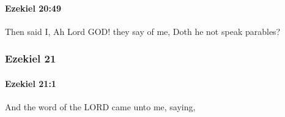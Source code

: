 		\paragraph{Ezekiel 20:49} %
			\label{EZEKIEL-20-49}

			Then said I, Ah Lord GOD! they say of me, Doth he not speak parables?

	\subsubsection{Ezekiel 21} %
		\label{EZEKIEL-21}

		\paragraph{Ezekiel 21:1} %
			\label{EZEKIEL-21-1}

			And the word of the LORD came unto me, saying,


